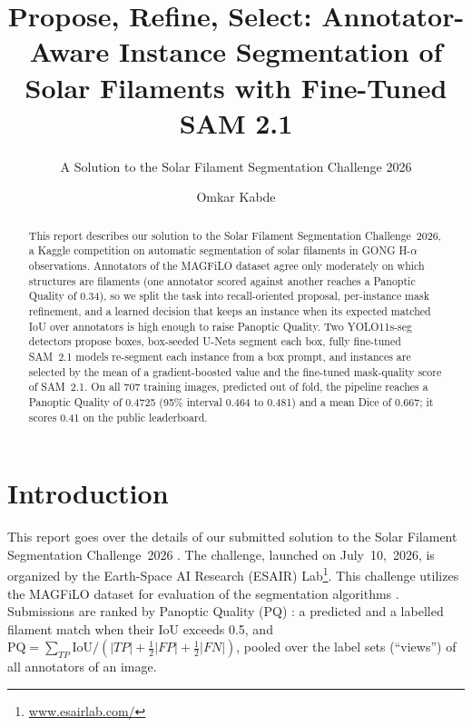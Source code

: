 \documentclass[sigconf]{acmart}
\begin{document}
\title{Propose, Refine, Select: Annotator-Aware Instance Segmentation of Solar Filaments with Fine-Tuned SAM 2.1}
\subtitle{A Solution to the Solar Filament Segmentation Challenge 2026} %

\author{Omkar Kabde}

\begin{abstract}
This report describes our solution to the Solar Filament Segmentation Challenge~2026, a Kaggle competition on automatic segmentation of solar filaments in GONG H-$\alpha$ observations. Annotators of the MAGFiLO dataset agree only moderately on which structures are filaments (one annotator scored against another reaches a Panoptic Quality of 0.34), so we split the task into recall-oriented proposal, per-instance mask refinement, and a learned decision that keeps an instance when its expected matched IoU over annotators is high enough to raise Panoptic Quality. Two YOLO11s-seg detectors propose boxes, box-seeded U-Nets segment each box, fully fine-tuned SAM~2.1 models re-segment each instance from a box prompt, and instances are selected by the mean of a gradient-boosted value and the fine-tuned mask-quality score of SAM~2.1. On all 707 training images, predicted out of fold, the pipeline reaches a Panoptic Quality of 0.4725 (95\% interval 0.464 to 0.481) and a mean Dice of 0.667; it scores 0.41 on the public leaderboard.
\end{abstract}

\maketitle

\section{Introduction}
This report goes over the details of our submitted solution to the Solar Filament Segmentation Challenge~2026 \cite{filament-segmentation-2026}. The challenge, launched on July~10,~2026, is organized by the Earth-Space AI Research (ESAIR) Lab\footnote{\href{https://www.esairlab.com/home}{www.esairlab.com/}}. This challenge utilizes the MAGFiLO dataset for evaluation of the segmentation algorithms \cite{ahmadzadeh2024dataset}.
Submissions are ranked by Panoptic Quality (PQ) \cite{pq}: a predicted and a labelled filament match when their IoU exceeds 0.5, and $\mathrm{PQ}=\sum_{TP}\mathrm{IoU}/(|TP|+\tfrac12|FP|+\tfrac12|FN|)$, pooled over the label sets (``views'') of all annotators of an image.
\end{document}
